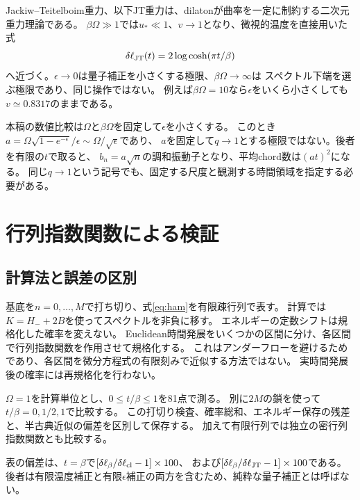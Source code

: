 \documentclass[a4paper,11pt]{ltjsarticle}
\numberwithin{equation}{section}
\begin{document}
Jackiw--Teitelboim重力、以下JT重力は、dilatonが曲率を一定に制約する二次元重力理論である。
$\beta\Omega\gg1$では$u_*\ll1$、$v\to1$となり、微視的温度を直接用いた式
\begin{equation}
 \delta\ell_{\rm JT}(t)=2\log\cosh(\pi t/\beta)
 \label{eq:jt}
\end{equation}
へ近づく。$\epsilon\to0$は量子補正を小さくする極限、$\beta\Omega\to\infty$は
スペクトル下端を選ぶ極限であり、同じ操作ではない。
例えば$\beta\Omega=10$なら$\epsilon$をいくら小さくしても$v\simeq0.8317$のままである。

本稿の数値比較は$\Omega$と$\beta\Omega$を固定して$\epsilon$を小さくする。
このとき$a=\Omega\sqrt{1-e^{-\epsilon}}/\epsilon\sim\Omega/\sqrt\epsilon$であり、
$a$を固定して$q\to1$とする極限ではない。後者を有限の$t$で取ると、
$b_n=a\sqrt n$の調和振動子となり、平均chord数は$(at)^2$になる。
同じ$q\to1$という記号でも、固定する尺度と観測する時間領域を指定する必要がある。

\section{行列指数関数による検証}
\subsection{計算法と誤差の区別}
基底を$n=0,\ldots,M$で打ち切り、式\eqref{eq:ham}を有限疎行列で表す。
計算では$K=H_-+2B$を使ってスペクトルを非負に移す。
エネルギーの定数シフトは規格化した確率を変えない。
Euclidean時間発展をいくつかの区間に分け、各区間で行列指数関数を作用させて規格化する。
これはアンダーフローを避けるためであり、各区間を微分方程式の有限刻みで近似する方法ではない。
実時間発展後の確率には再規格化を行わない。

$\Omega=1$を計算単位とし、$0\leq t/\beta\leq1$を81点で測る。
別に$2M$の鎖を使って$t/\beta=0,1/2,1$で比較する。
この打切り検査、確率総和、エネルギー保存の残差と、半古典近似の偏差を区別して保存する。
加えて有限行列では独立の密行列指数関数とも比較する。

表の偏差は、$t=\beta$で$[\delta\ell_\beta/\delta\ell_{\rm cl}-1]\times100$、
および$[\delta\ell_\beta/\delta\ell_{\rm JT}-1]\times100$である。
後者は有限温度補正と有限$\epsilon$補正の両方を含むため、純粋な量子補正とは呼ばない。
\begin{table}[htbp]
\centering\small

\caption{熱的準備を含む鎖の数値計算。$t=t_L+t_R$。
最後の二列は数値計算の丸め誤差ではなく、指定した近似式からの偏差である。}
\label{tab:thermal}
\end{table}
\end{document}
